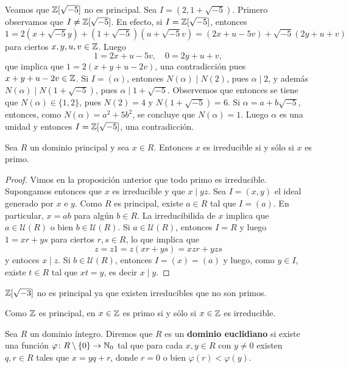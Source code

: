 \begin{example}
Veamos que $\mathbb{Z}[\sqrt{-5}]$ no es principal. Sea $I=(2,1+\sqrt{-5})$. Primero
observamos que $I\ne\mathbb{Z}[\sqrt{-5}]$. En efecto, si $I=\mathbb{Z}[\sqrt{-5}]$, entonces
\[
1=2(x+\sqrt{-5}y)+(1+\sqrt{-5})(u+\sqrt{-5}v)=(2x+u-5v)+\sqrt{-5}(2y+u+v)
\]
para ciertos $x,y,u,v\in\mathbb{Z}$. Luego
\[
1=2x+u-5v,\quad
0=2y+u+v,
\]
que implica que $1=2(x+y+u-2v)$, una contradicción pues $x+y+u-2v\in\mathbb{Z}$. 
Si $I=(\alpha)$, entonces 
$N(\alpha)\mid N(2)$, pues 
$\alpha\mid 2$, y además  
$N(\alpha)\mid N(1+\sqrt{-5})$, pues 
$\alpha\mid 1+\sqrt{-5}$. 
Observemos que entonces se tiene que $N(\alpha)\in\{1,2\}$, pues $N(2)=4$ y $N(1+\sqrt{-5})=6$. 
Si $\alpha=a+b\sqrt{-5}$, entonces, como $N(\alpha)=a^2+5b^2$, se concluye que $N(\alpha)=1$. Luego 
$\alpha$ es una unidad y entonces $I=\mathbb{Z}[\sqrt{-5}]$, una contradicción.   
\end{example}

\begin{proposition}
Sea $R$ un dominio principal y sea $x\in R$. Entonces $x$ es irreducible si y sólo si $x$ es primo.
\end{proposition}

\begin{proof}
	Vimos en la proposición anterior que todo primo es irreducible. Supongamos entonces que $x$ es irreducible y
	que $x\mid yz$. Sea $I=(x,y)$ el ideal generado por $x$ e $y$. Como $R$ es principal, existe $a\in R$ tal que
	$I=(a)$. En particular, $x=ab$ para algún $b\in R$. La irreducibilida de $x$ implica que $a\in\mathcal{U}(R)$ o bien
	$b\in\mathcal{U}(R)$. Si $a\in\mathcal{U}(R)$, entonces $I=R$ y luego $1=xr+ys$ para ciertos $r,s\in R$, lo que 
	implica que
	\[
	z=z1=z(xr+ys)=xzr+yzs
	\]
	y entoces $x\mid z$. Si $b\in\mathcal{U}(R)$, entonces $I=(x)=(a)$ y luego, como $y\in I$, existe
	$t\in R$ tal que $xt=y$, es decir $x\mid y$. 	
\end{proof}
	
\begin{example}
$\mathbb{Z}[\sqrt{-3}]$ 
no es principal ya que existen irreducibles que no son primos.
\end{example}

\begin{example}
Como $\mathbb{Z}$ es principal, en $x\in \mathbb{Z}$ es primo si y sólo si $x\in\mathbb{Z}$ es irreducible.  
\end{example}

\begin{definition}
Sea $R$ un dominio íntegro. Diremos que $R$ es un \textbf{dominio euclidiano} 
si existe una función $\varphi\colon R\setminus\{0\}\to\mathbb{N}_0$ 
tal que para cada $x,y\in R$ con $y\ne0$ existen $q,r\in R$ tales que $x=yq+r$, donde $r=0$ o bien $\varphi(r)<\varphi(y)$.  
\end{definition}


